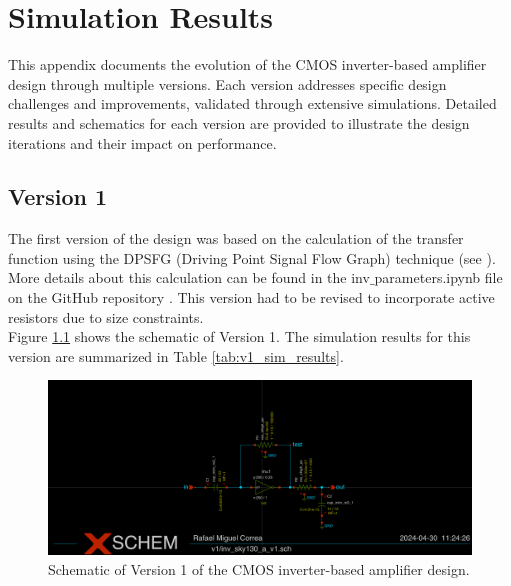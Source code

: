 \chapter{Simulation Results}
\label{AppendixA}

This appendix documents the evolution of the CMOS inverter-based amplifier design through multiple versions. Each version addresses specific design challenges and improvements, validated through extensive simulations. Detailed results and schematics for each version are provided to illustrate the design iterations and their impact on performance.

\section{Version 1}

The first version of the design was based on the calculation of the transfer function using the DPSFG (Driving Point Signal Flow Graph) technique (see \textcite{Schmid_Huber_2018}). 
More details about this calculation can be found in the inv$\_$parameters.ipynb file on the GitHub repository \cite{miguelcorrea0107_2024}. 
This version had to be revised to incorporate active resistors due to size constraints.
\\
Figure \ref{fig:v1_schematic} shows the schematic of Version 1. 
The simulation results for this version are summarized in Table \ref{tab:v1_sim_results}.
\begin{figure}[ht!]
    \centering
    \includegraphics[width=\textwidth]{Figures/v1_schematic.png}
    \caption{Schematic of Version 1 of the CMOS inverter-based amplifier design.}
    \label{fig:v1_schematic}
\end{figure}


